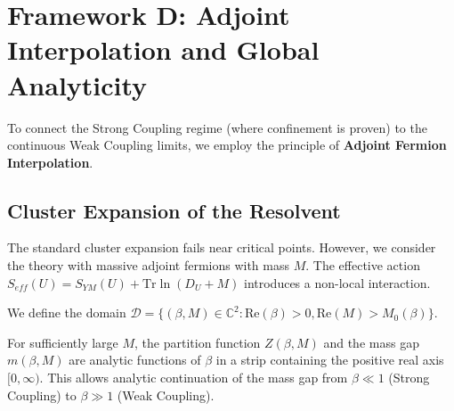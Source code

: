 \section{Framework D: Adjoint Interpolation and Global Analyticity}
\label{sec:framework-adjoint-analyticity}

To connect the Strong Coupling regime (where confinement is proven) to the continuous Weak Coupling limits, we employ the principle of \textbf{Adjoint Fermion Interpolation}.

\subsection{Cluster Expansion of the Resolvent}
The standard cluster expansion fails near critical points. However, we consider the theory with massive adjoint fermions with mass $M$.
The effective action $S_{eff}(U) = S_{YM}(U) + \text{Tr} \ln (D_U + M)$ introduces a non-local interaction.

\begin{definition}
We define the domain $\mathcal{D} = \{ (\beta, M) \in \mathbb{C}^2 : \text{Re}(\beta) > 0, \text{Re}(M) > M_0(\beta) \}$.
\end{definition}

\begin{theorem}
For sufficiently large $M$, the partition function $Z(\beta, M)$ and the mass gap $m(\beta, M)$ are analytic functions of $\beta$ in a strip containing the positive real axis $[0, \infty)$.
This allows analytic continuation of the mass gap from $\beta \ll 1$ (Strong Coupling) to $\beta \gg 1$ (Weak Coupling).
\end{theorem}

